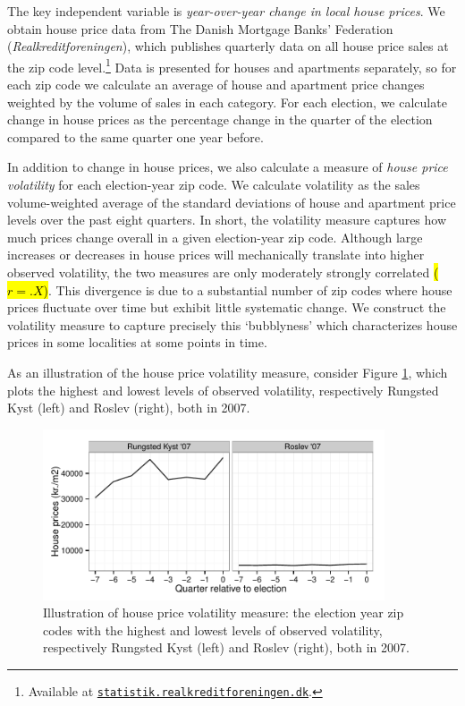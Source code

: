 \documentclass[12pt,a4paper]{article}
\begin{document}
The key independent variable is \textit{year-over-year change in local house prices}. We obtain house price data from The Danish Mortgage Banks' Federation (\textit{Realkreditforeningen}), which publishes quarterly data on all house price sales at the zip code level.\footnote{Available at \texttt{\href{http://statistik.realkreditforeningen.dk/}{statistik.realkreditforeningen.dk}}.} Data is presented for houses and apartments separately, so for each zip code we calculate an average of house and apartment price changes weighted by the volume of sales in each category. For each election, we calculate change in house prices as the percentage change in the quarter of the election compared to the same quarter one year before.

In addition to change in house prices, we also calculate a measure of \textit{house price volatility} for each election-year zip code. We calculate volatility as the sales volume-weighted average of the standard deviations of house and apartment price levels over the past eight quarters. In short, the volatility measure captures how much prices change overall in a given election-year zip code. Although large increases or decreases in house prices will mechanically translate into higher observed volatility, the two measures are only moderately strongly correlated \hl{($r=.X$)}. This divergence is due to a substantial number of zip codes where house prices fluctuate over time but exhibit little systematic change. We construct the volatility measure to capture precisely this `bubblyness' which characterizes house prices in some localities at some points in time.

As an illustration of the house price volatility measure, consider Figure \ref{volcases}, which plots the highest and lowest levels of observed volatility, respectively Rungsted Kyst (left) and Roslev (right), both in 2007.

\begin{figure}[htbp!]
	\includegraphics[width=0.9\textwidth]{../figures/volcases}
	\centering
	\caption{Illustration of house price volatility measure: the election year zip codes with the highest and lowest levels of observed volatility, respectively Rungsted Kyst (left) and Roslev (right), both in 2007.}\label{volcases}
\end{figure}
\end{document}

